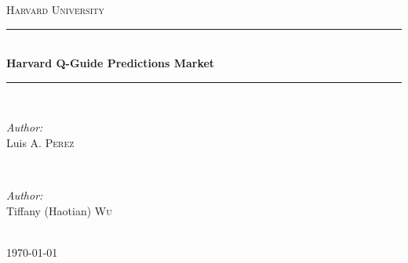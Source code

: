 \begin{titlepage}

\newcommand{\HRule}{\rule{\linewidth}{0.5mm}} %

\center %
 

\textsc{\LARGE Harvard University}\\[1.5cm] %


\HRule \\[0.4cm]
{ \huge \bfseries Harvard Q-Guide Predictions Market}\\[0.4cm] %
\HRule \\[1.5cm]
 

\begin{minipage}{0.4\textwidth}
\begin{flushleft} \large
\emph{Author:}\\
Luis A. \textsc{Perez} %
\end{flushleft}
\end{minipage}
~
\begin{minipage}{0.4\textwidth}
\begin{flushright} \large
\emph{Author:} \\
Tiffany (Haotian) \textsc{Wu} %
\end{flushright}
\end{minipage}\\[2cm]


{\large \today}\\[2cm] %


\end{titlepage}
